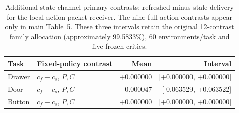 \documentclass[10pt,a4paper]{article}
\begin{document}
\renewcommand{\thetable}{S\arabic{table}}
\setcounter{table}{10}
\begin{table}[H]\centering\small
\caption{Additional state-channel primary contrasts: refreshed minus stale delivery for the local-action packet receiver. The nine full-action contrasts appear only in main Table~5. These three intervals retain the original 12-contrast family allocation (approximately 99.5833\%), 60 environments/task and five frozen critics.}
\begin{tabular}{llrr}\toprule Task & Fixed-policy contrast & Mean & Interval\\\midrule
Drawer & $c_f-c_s$, $P,C$ & +0.000000 & [+0.000000, +0.000000]\\
Door & $c_f-c_s$, $P,C$ & -0.000047 & [-0.063529, +0.063522]\\
Button & $c_f-c_s$, $P,C$ & +0.000000 & [+0.000000, +0.000000]\\
\bottomrule\end{tabular}\end{table}
\end{document}
